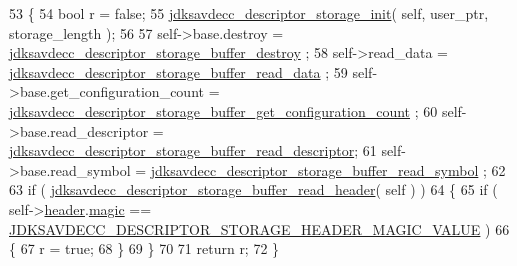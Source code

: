 \begin{DoxyCode}
53 \{
54     \textcolor{keywordtype}{bool} r = \textcolor{keyword}{false};
55     \hyperlink{group__jdksavdecc__descriptor__storage_ga8057702fdd5c972ac954b7e5d0705d08}{jdksavdecc\_descriptor\_storage\_init}( \textcolor{keyword}{self}, user\_ptr, storage\_length );
56 
57     \textcolor{keyword}{self}->base.destroy = \hyperlink{group__jdksavdecc__descriptor__storage_gad6e346417d827a92e2c65a591df14107}{jdksavdecc\_descriptor\_storage\_buffer\_destroy}
      ;
58     \textcolor{keyword}{self}->read\_data = \hyperlink{group__jdksavdecc__descriptor__storage_gaeb0c0ea255f21a660b890061e5083d81}{jdksavdecc\_descriptor\_storage\_buffer\_read\_data}
      ;
59     \textcolor{keyword}{self}->base.get\_configuration\_count = 
      \hyperlink{group__jdksavdecc__descriptor__storage_gaf481852d6558c9f414162824c93d781b}{jdksavdecc\_descriptor\_storage\_buffer\_get\_configuration\_count}
      ;
60     \textcolor{keyword}{self}->base.read\_descriptor = 
      \hyperlink{group__jdksavdecc__descriptor__storage_gaf9627c1f35647ec53353aea3506ea100}{jdksavdecc\_descriptor\_storage\_buffer\_read\_descriptor};
61     \textcolor{keyword}{self}->base.read\_symbol = \hyperlink{group__jdksavdecc__descriptor__storage_ga37f13bb444e21c5244641d43ddf35419}{jdksavdecc\_descriptor\_storage\_buffer\_read\_symbol}
      ;
62 
63     \textcolor{keywordflow}{if} ( \hyperlink{group__jdksavdecc__descriptor__storage_ga7c0f7088936576fa27511da7fde01a1a}{jdksavdecc\_descriptor\_storage\_buffer\_read\_header}( \textcolor{keyword}{
      self} ) )
64     \{
65         \textcolor{keywordflow}{if} ( self->\hyperlink{structjdksavdecc__descriptor__storage_ab5243bc10c0547b567bfe308e571200e}{header}.\hyperlink{structjdksavdecc__descriptor__storage__header_a57f54349f4fd1cbbb52058812e146af2}{magic} == 
      \hyperlink{group__descriptor__storage__header_ga8a1885a60309a8834fb5d3505d63c400}{JDKSAVDECC\_DESCRIPTOR\_STORAGE\_HEADER\_MAGIC\_VALUE} )
66         \{
67             r = \textcolor{keyword}{true};
68         \}
69     \}
70 
71     \textcolor{keywordflow}{return} r;
72 \}
\end{DoxyCode}


